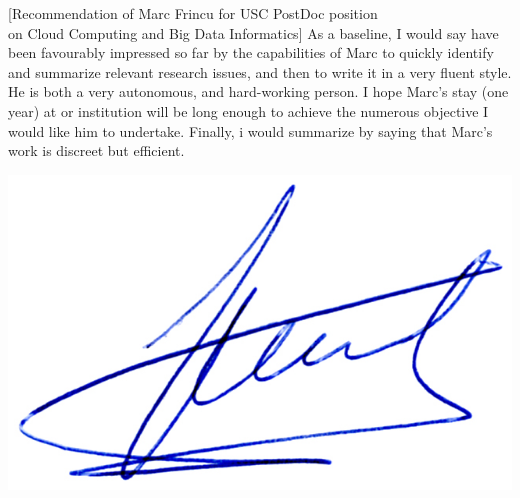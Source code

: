\documentclass[a4paper,10pt]{article}
\begin{document}
\begin{letter}[Recommendation of Marc Frincu for USC PostDoc position\\
on Cloud Computing and Big Data Informatics]
As  a baseline, I would say have  been  favourably  impressed  so  far  by  the
capabilities of Marc to quickly identify and summarize relevant research issues,
and then to write it in a very  fluent style.  He is both a very autonomous, and
hard-working person.   I hope Marc's stay  (one year) at or  institution will be
long enough to achieve the numerous objective I would like him to undertake.
Finally, i  would summarize by saying that Marc's  work is discreet but efficient.

\end{letter}

\begin{flushright}
\includegraphics[width=.30\textwidth]{signgenaud.jpg}
\end{flushright}
%
%
\end{document}
